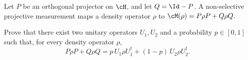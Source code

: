 Let $P$ be an orthogonal projector on $\cH$, and let $Q=\Id-P$. A non-selective projective measurement maps a density operator $\rho$ to $\cM(\rho) = P\rho P+Q\rho Q.$

Prove that there exist two unitary operators $U_1,U_2$ and a probability $p\in[0,1]$ such that, for every density operator $\rho$,
$$
P\rho P+Q\rho Q
=
p\,U_1\rho U_1^\dagger
+
(1-p)\,U_2\rho U_2^\dagger.
$$
